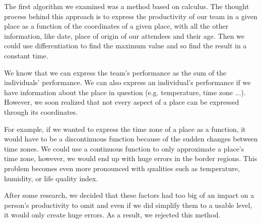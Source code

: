 
The first algorithm we examined was a method based on calculus. The thought process behind this approach is to express the productivity of our team in a given place as a function of the coordinates of a given place, with all the other information, like date, place of origin of our attendees and their age. Then we could use differentiation to find the maximum value and so find the result in a constant time. 

We know that we can express the team's performance as the sum of the individuals' performance. We can also express an individual's performance if we have information about the place in question (e.g. temperature, time zone ...). However, we soon realized that not every aspect of a place can be expressed through its coordinates. 

For example, if we wanted to express the time zone of a place as a function, it would have to be a discontinuous function because of the sudden changes between time zones. We could use a continuous function to only approximate a place's time zone, however, we would end up with huge errors in the border regions. This problem becomes even more pronounced with qualities such as temperature, humidity, or life quality index. 

After some research, we decided that these factors had too big of an impact on a person's productivity to omit and even if we did simplify them to a usable level, it would only create huge errors. As a result, we rejected this method.

